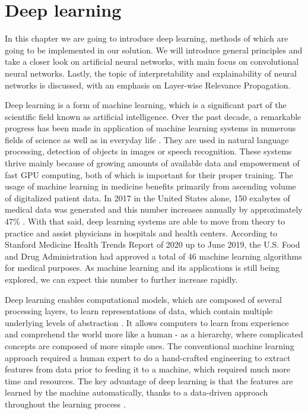 
\chapter{Deep learning}
In this chapter we are going to introduce deep learning, methods of which are going to be implemented in our solution. We will introduce general principles and take a closer look on artificial neural networks, with main focus on convolutional neural networks. Lastly, the topic of interpretability and explainability of neural networks is discussed, with an emphasis on Layer-wise Relevance Propagation.

Deep learning is a form of machine learning, which is a significant part of the scientific field known as artificial intelligence. Over the past decade, a remarkable progress has been made in application of machine learning systems in numerous fields of science as well as in everyday life \cite{longsurvey2018}. They are used in natural language processing, detection of objects in images or speech recognition. These systems thrive mainly because of growing amounts of available data and empowerment of fast GPU computing, both of which is important for their proper training. The usage of machine learning in medicine benefits primarily from ascending volume of digitalized patient data. In 2017 in the United States alone, 150 exabytes of medical data was generated and this number increases annually by approximately 47\% \cite{stanford2017}. With that said, deep learning systems are able to move from theory to practice and assist physicians in hospitals and health centers. According to Stanford Medicine Health Trends Report of 2020 \cite{stanford2020} up to June 2019, the U.S. Food and Drug Administration had approved a total of 46 machine learning algorithms for medical purposes. As machine learning and its applications is still being explored, we can expect this number to further increase rapidly.

Deep learning enables computational models, which are composed of several processing layers, to learn representations of data, which contain multiple  underlying levels of abstraction \cite{greekDeepLearning}. It allows computers to learn from experience and comprehend the world more like a human - as a hierarchy, where complicated concepts are composed of more simple ones. \cite{deeplearningbook} The conventional machine learning approach required a human expert to do a hand-crafted engineering to extract features from data prior to feeding it to a machine, which required much more time and resources. The key advantage of deep learning is that the features are learned by the machine automatically, thanks to a data-driven approach throughout the learning process \cite{deeplearningHealthcare}. 



